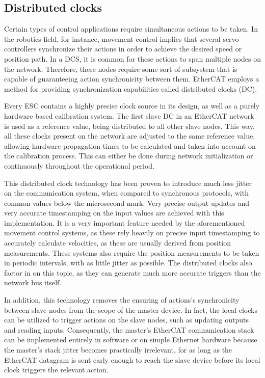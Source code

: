 \subsection{Distributed clocks}

Certain types of control applications require simultaneous actions to be taken.
In the robotics field, for instance, movement control implies that several servo controllers synchronize their actions in order to  achieve the desired speed or position path.
In a DCS, it is common for these actions to span multiple nodes on the network.
Therefore, these nodes require some sort of subsystem that is capable of guaranteeing action synchronicity between them.
EtherCAT employs a method for providing synchronization capabilities called distributed clocks (DC).

Every ESC contains a highly precise clock source in its design, as well as a purely hardware based calibration system.
The first slave DC in an EtherCAT network is used as a reference value, being distributed to all other slave nodes.
This way, all these clocks present on the network are adjusted to the same reference value, allowing hardware propagation times to be calculated and taken into account on the calibration process.
This can either be done during network initialization or continuously throughout the operational period.

This distributed clock technology has been proven to introduce much less jitter on the communication system, when compared to synchronous protocols, with common values below the microsecond mark.
Very precise output updates and very accurate timestamping on the input values are achieved with this implementation.
It is a very important feature needed by the aforementioned movement control systems, as these rely heavily on precise input timestamping to accurately calculate velocities, as these are usually derived from position measurements.
These systems also require the position measurements to be taken in periodic intervals, with as little jitter as possible.
The distributed clocks also factor in on this topic, as they can generate much more accurate triggers than the network bus itself.

In addition, this technology removes the ensuring of actions's synchronicity between slave nodes from the scope of the master device.
In fact, the local clocks can be utilized to trigger actions on the slave nodes, such as updating outputs and reading inputs.
Consequently, the master's EtherCAT communication stack can be implemented entirely in software or on simple Ethernet hardware because the master's stack jitter becomes practically irrelevant, for as long as the EtherCAT datagram is sent early enough to reach the slave device before its local clock triggers the relevant action.

